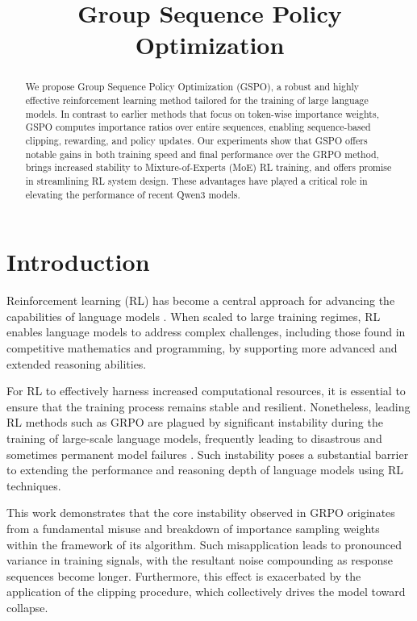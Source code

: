 \title{Group Sequence Policy Optimization}

\begin{abstract}
We propose Group Sequence Policy Optimization (GSPO), a robust and highly effective reinforcement learning method tailored for the training of large language models. In contrast to earlier methods that focus on token-wise importance weights, GSPO computes importance ratios over entire sequences, enabling sequence-based clipping, rewarding, and policy updates. Our experiments show that GSPO offers notable gains in both training speed and final performance over the GRPO method, brings increased stability to Mixture-of-Experts (MoE) RL training, and offers promise in streamlining RL system design. These advantages have played a critical role in elevating the performance of recent Qwen3 models.
\end{abstract}

\section{Introduction}
\label{sec:intro}

Reinforcement learning (RL) has become a central approach for advancing the capabilities of language models \citep{o1,dpsk-r1,qwq32b,qwen3}. When scaled to large training regimes, RL enables language models to address complex challenges, including those found in competitive mathematics and programming, by supporting more advanced and extended reasoning abilities.

For RL to effectively harness increased computational resources, it is essential to ensure that the training process remains stable and resilient. Nonetheless, leading RL methods such as GRPO \citep{grpo} are plagued by significant instability during the training of large-scale language models, frequently leading to disastrous and sometimes permanent model failures \citep{qwen3, minimax-m1}. Such instability poses a substantial barrier to extending the performance and reasoning depth of language models using RL techniques.

This work demonstrates that the core instability observed in GRPO originates from a fundamental misuse and breakdown of importance sampling weights within the framework of its algorithm. Such misapplication leads to pronounced variance in training signals, with the resultant noise compounding as response sequences become longer. Furthermore, this effect is exacerbated by the application of the clipping procedure, which collectively drives the model toward collapse.

